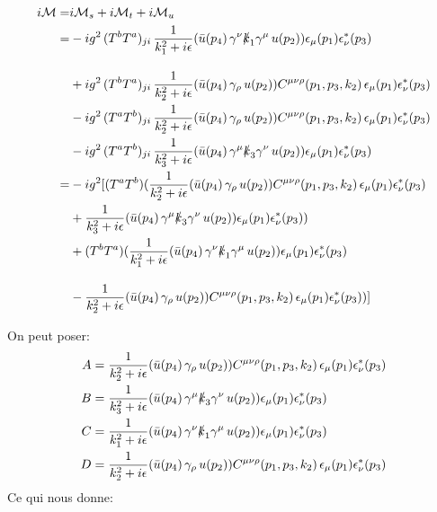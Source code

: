 \documentclass[12pt, a4paper]{article}
\begin{document}
 	\begin{equation}
 		\begin{split}
 			i\mathcal{M}=
 			&i\mathcal{M}_s + i\mathcal{M}_t + i\mathcal{M}_u \\
 			=& -i g^2 \, (T^b T^a)_{ji} \, \frac{1}{k_1^2+ i\epsilon} ( \bar{u}(p_4) \, \gamma^\nu \slashed{k}_1 \gamma^\mu \, u(p_2) ) \epsilon_\mu(p_1) \epsilon_\nu^*(p_3) \\[1em]
 			&+i g^2 \, (T^b T^a)_{ji} \, \frac{1}{k_2^2+ i\epsilon} ( \bar{u}(p_4) \, \gamma_\rho \, u(p_2) ) C^{\mu\nu\rho}(p_1, p_3, k_2) \, \epsilon_\mu(p_1) \epsilon_\nu^*(p_3) \\
 			&-i g^2 \, (T^a T^b)_{ji} \, \frac{1}{k_2^2+ i\epsilon} ( \bar{u}(p_4) \, \gamma_\rho \, u(p_2) ) C^{\mu\nu\rho}(p_1, p_3, k_2) \, \epsilon_\mu(p_1) \epsilon_\nu^*(p_3) \\
 			& -i g^2 \, (T^a T^b)_{ji} \, \frac{1}{k_3^2+ i\epsilon} ( \bar{u}(p_4) \, \gamma^\mu \slashed{k}_3 \gamma^\nu \, u(p_2) ) \epsilon_\mu(p_1) \epsilon_\nu^*(p_3)\\
 			=
 			&-i g^2 
 			[
 			(T^a T^b)
 			(\frac{1}{k_2^2+ i\epsilon}  (\bar{u}(p_4) \, \gamma_\rho \, u(p_2) ) C^{\mu\nu\rho}(p_1, p_3, k_2) \, \epsilon_\mu(p_1) \epsilon_\nu^*(p_3)\\
 			&+ \frac{1}{k_3^2+ i\epsilon} ( \bar{u}(p_4) \, \gamma^\mu \slashed{k}_3 \gamma^\nu \, u(p_2) ) \epsilon_\mu(p_1) \epsilon_\nu^*(p_3))\\
 			&+
 			(T^b T^a)
 			(\frac{1}{k_1^2+ i\epsilon} ( \bar{u}(p_4) \, \gamma^\nu \slashed{k}_1 \gamma^\mu \, u(p_2)) \epsilon_\mu(p_1) \epsilon_\nu^*(p_3) \\[1em]
 			&-\frac{1}{k_2^2+ i\epsilon} ( \bar{u}(p_4) \, \gamma_\rho \, u(p_2) ) C^{\mu\nu\rho}(p_1, p_3, k_2) \, \epsilon_\mu(p_1) \epsilon_\nu^*(p_3))] \\						
 		\end{split}
 	\end{equation}
 	
 	On peut poser:
 	\begin{equation}
 		\begin{split}
	 		A&=\frac{1}{k_2^2+ i\epsilon}  (\bar{u}(p_4) \, \gamma_\rho \, u(p_2) ) C^{\mu\nu\rho}(p_1, p_3, k_2) \, \epsilon_\mu(p_1) \epsilon_\nu^*(p_3)\\
	 		B&=\frac{1}{k_3^2+ i\epsilon} ( \bar{u}(p_4) \, \gamma^\mu \slashed{k}_3 \gamma^\nu \, u(p_2) ) \epsilon_\mu(p_1) \epsilon_\nu^*(p_3) \\
	 		C&=\frac{1}{k_1^2+ i\epsilon} ( \bar{u}(p_4) \, \gamma^\nu \slashed{k}_1 \gamma^\mu \, u(p_2)) \epsilon_\mu(p_1) \epsilon_\nu^*(p_3) \\
	 		D&=\frac{1}{k_2^2+ i\epsilon} ( \bar{u}(p_4) \, \gamma_\rho \, u(p_2) ) C^{\mu\nu\rho}(p_1, p_3, k_2) \, \epsilon_\mu(p_1) \epsilon_\nu^*(p_3)
 		\end{split}
 	\end{equation}
 	Ce qui nous donne:
 	\nocite{*}
 	
 	
 
\end{document}
